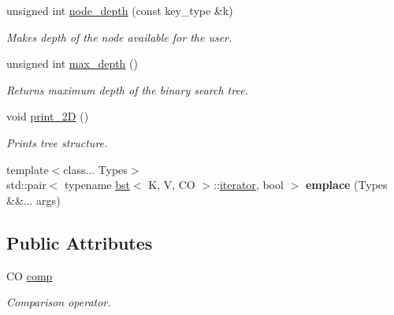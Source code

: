\begin{DoxyCompactItemize}
unsigned int \hyperlink{classbst_ad51cfdf4a6b9fdba73d605e5c56f0dc9}{node\+\_\+depth} (const key\+\_\+type \&k)
\begin{DoxyCompactList}\small\item\em Makes depth of the node available for the user. \end{DoxyCompactList}\item 
unsigned int \hyperlink{classbst_a8fbf73218beab695fbb039323df137cb}{max\+\_\+depth} ()
\begin{DoxyCompactList}\small\item\em Returns maximum depth of the binary search tree. \end{DoxyCompactList}\item 
\mbox{\label{classbst_a47a464861ba37f5f58e048a407b952b7}} 
void \hyperlink{classbst_a47a464861ba37f5f58e048a407b952b7}{print\+\_\+2D} ()
\begin{DoxyCompactList}\small\item\em Prints tree structure. \end{DoxyCompactList}\item 
\mbox{\label{classbst_a6b5ded79118ea21e8a6417b156e97ac2}} 
{\footnotesize template$<$class... Types$>$ }\\std\+::pair$<$ typename \hyperlink{classbst}{bst}$<$ K, V, CO $>$\+::\hyperlink{classbst_a9378fa7f3f48ee62f3a0b4d168d8d98b}{iterator}, bool $>$ {\bfseries emplace} (Types \&\&... args)
\end{DoxyCompactItemize}
\subsection*{Public Attributes}
\begin{DoxyCompactItemize}
\item 
\mbox{\label{classbst_afb5e2d774d14e5451c4d38bf62ccdff4}} 
CO \hyperlink{classbst_afb5e2d774d14e5451c4d38bf62ccdff4}{comp}
\begin{DoxyCompactList}\small\item\em Comparison operator. \end{DoxyCompactList}\end{DoxyCompactItemize}
